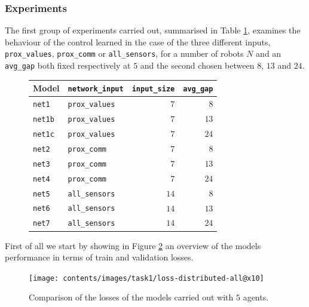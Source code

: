 \subsubsection{Experiments}
\label{subsubsec:expdist}

The first group of experiments carried out, summarised in Table 
\ref{tab:modeln5dist}, examines the behaviour of the control learned in the case 
of the three different inputs, \texttt{prox\_values}, \texttt{prox\_comm} or 
\texttt{all\_sensors}, for a number of robots $N$ and an \texttt{avg\_gap} both 
fixed respectively at $5$ and the second chosen between $8$, $13$ and $24$.
\begin{figure}[H]
	\centering
	\begin{tabular}{llrr}
		\toprule
		\textbf{Model} \quad & \textbf{\texttt{network\_input}} & 
		\textbf{\texttt{input\_size}} &
		\textbf{\texttt{avg\_gap}} \\
		\midrule
		\texttt{net1} 				 & \texttt{prox\_values}	&  $  7$  &  $  8$  \\
		\texttt{net1b} 				& \texttt{prox\_values}	   &  $  7$  &  $13$ \\
		\texttt{net1c} 				& \texttt{prox\_values}	   &  $  7$  &  $24$  \\
		\texttt{net2} 				 & \texttt{prox\_comm}	  &  $  7$  &  $  8$  \\
		\texttt{net3} 				 & \texttt{prox\_comm}	  &  $  7$  &  $13$  \\
		\texttt{net4} 				 & \texttt{prox\_comm}	  &  $  7$  &  $24$  \\
		\texttt{net5} 				 & \texttt{all\_sensors}	  &  $14$  &  $  8$  \\
		\texttt{net6} 				 & \texttt{all\_sensors}	  &  $14$  &  $13$ 	\\
		\texttt{net7} 				 & \texttt{all\_sensors}	  &  $14$  &  $24$ 	\\
		\bottomrule
	\end{tabular}
	\label{tab:modeln5dist}
\end{figure}

First of all we start by showing in Figure \ref{fig:distloss} an overview of the 
models performance in terms of train and validation losses. 
\begin{figure}[!htb]
	\centering
	\texttt{[image: contents/images/task1/loss-distributed-all@x10]}%
	\caption{Comparison of the losses of the models carried out with $5$ agents.}
	\label{fig:distloss}
\end{figure}

